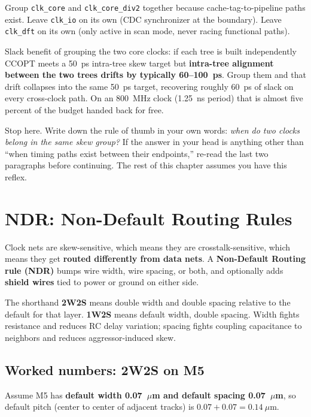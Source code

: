 Group \texttt{clk\_core} and \texttt{clk\_core\_div2} together because cache-tag-to-pipeline paths exist. Leave \texttt{clk\_io} on its own (CDC synchronizer at the boundary). Leave \texttt{clk\_dft} on its own (only active in scan mode, never racing functional paths).

Slack benefit of grouping the two core clocks: if each tree is built independently CCOPT meets a 50~ps intra-tree skew target but \textbf{intra-tree alignment between the two trees drifts by typically 60--100~ps}. Group them and that drift collapses into the same 50~ps target, recovering roughly 60~ps of slack on every cross-clock path. On an 800~MHz clock (1.25~ns period) that is almost five percent of the budget handed back for free.

\begin{pausebox}
Stop here. Write down the rule of thumb in your own words: \emph{when do two clocks belong in the same skew group?} If the answer in your head is anything other than ``when timing paths exist between their endpoints,'' re-read the last two paragraphs before continuing. The rest of this chapter assumes you have this reflex.
\end{pausebox}

\section{NDR: Non-Default Routing Rules}

Clock nets are skew-sensitive, which means they are crosstalk-sensitive, which means they get \textbf{routed differently from data nets}. A \textbf{Non-Default Routing rule (NDR)} bumps wire width, wire spacing, or both, and optionally adds \textbf{shield wires} tied to power or ground on either side.

The shorthand \textbf{2W2S} means double width and double spacing relative to the default for that layer. \textbf{1W2S} means default width, double spacing. Width fights resistance and reduces RC delay variation; spacing fights coupling capacitance to neighbors and reduces aggressor-induced skew.

\subsection*{Worked numbers: 2W2S on M5}

Assume M5 has \textbf{default width 0.07~$\mu$m and default spacing 0.07~$\mu$m}, so default pitch (center to center of adjacent tracks) is $0.07 + 0.07 = 0.14~\mu$m.

